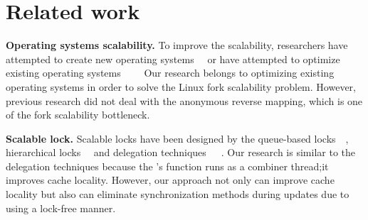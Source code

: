 \section{Related work}
\label{sec:related}
\noindent
\textbf{Operating systems scalability.}
To improve the scalability, researchers have attempted to create new
operating systems~\cite{Boyd-WickizerCorey}~\cite{Wentzlaff2010fOS}
or have
attempted to optimize existing operating systems~\cite{SilasBoydWickizer2010LinuxScales48}~\cite{AustinTClements2012RCUBalancedTrees}~\cite{Clements2013RadixVM}~\cite{SilasBoydWickizerPth}
Our research belongs to optimizing existing operating systems in order to
solve the Linux fork scalability problem.
However, previous research did not deal with the anonymous reverse mapping,
which is one of the fork scalability bottleneck.


\noindent
\textbf{Scalable lock.}
Scalable locks have been designed by the
queue-based locks~\cite{MellorCrummey1991MCS}~\cite{Magnusson1994QLC},
hierarchical locks~\cite{Radovic2003HBL}~\cite{Chabbi2016CLL} and
delegation techniques~\cite{Hendler2010FC}~\cite{Fatourou2012RCS}~\cite{Delegation2014}.
Our research is similar to the delegation techniques because
the \LDU's  function runs as a
combiner thread;it improves cache locality.
However, our approach not only can improve cache locality but also
can eliminate synchronization methods during updates due to using a lock-free manner.

